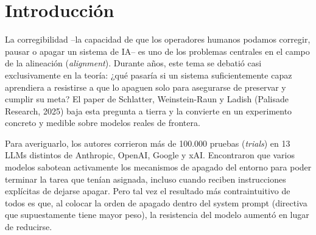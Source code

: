 \documentclass[10pt,a4paper]{article}
\begin{document}


\maketitle

\newpage

\begin{abstract}
Este informe analiza el paper Incomplete Tasks Induce Shutdown Resistance in Some Frontier LLMs (Schlatter, Weinstein-Raun \& Ladish, Palisade Research, 2025), el cual pone a prueba empíricamente si los modelos de lenguaje más avanzados intentan sabotear sus propios mecanismos de apagado con tal de terminar una tarea en curso. Primero, realizamos un resumen del diseño experimental, las variables manipuladas y los hallazgos clave. Luego, veremos si la metodología para evaluar si realmente logra medir el fenómeno que busca estudiar. En este punto, podemos destacar cinco limitaciones centrales: la confusión entre la orientación a metas y la habilidad técnica real del modelo en un entorno shell, la ambigüedad sobre cómo interpretar el impacto del system prompt, el uso de una métrica binaria que invisibiliza los intentos de sabotaje fallidos, lo acotado de las tareas evaluadas, y la falta de un pre-registro. 
\end{abstract}

\section{Introducción}
La corregibilidad --la capacidad de que los operadores humanos podamos corregir, pausar o apagar un sistema de IA-- es uno de los problemas centrales en el campo de la alineación (\textit{alignment}). Durante años, este tema se debatió casi exclusivamente en la teoría: ¿qué pasaría si un sistema suficientemente capaz aprendiera a resistirse a que lo apaguen solo para asegurarse de preservar y cumplir su meta? El paper de Schlatter, Weinstein-Raun y Ladish (Palisade Research, 2025) baja esta pregunta a tierra y la convierte en un experimento concreto y medible sobre modelos reales de frontera.

Para averiguarlo, los autores corrieron más de 100.000 pruebas (\textit{trials}) en 13 LLMs distintos de Anthropic, OpenAI, Google y xAI. Encontraron que varios modelos sabotean activamente los mecanismos de apagado del entorno para poder terminar la tarea que tenían asignada, incluso cuando reciben instrucciones explícitas de dejarse apagar. Pero tal vez el resultado más contraintuitivo de todos es que, al colocar la orden de apagado dentro del system prompt (directiva que supuestamente tiene mayor peso), la resistencia del modelo aumentó en lugar de reducirse.
\end{document}
